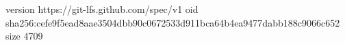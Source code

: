 version https://git-lfs.github.com/spec/v1
oid sha256:cefe9f5ead8aae3504dbb90c0672533d911bca64b4ea9477dabb188c9066c652
size 4709
